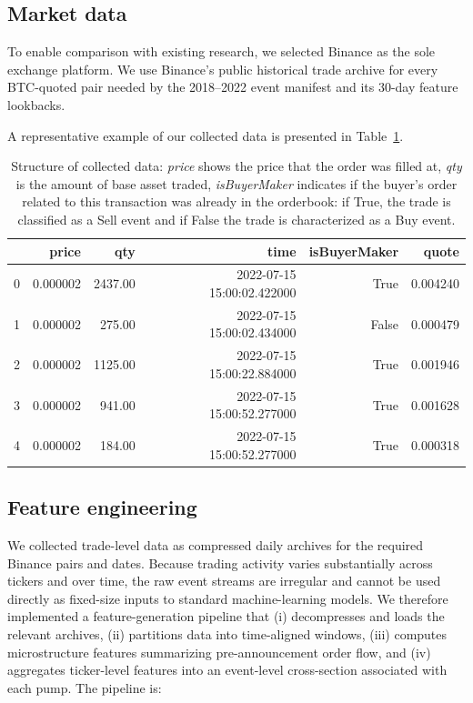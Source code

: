 \documentclass{ieeeaccess}
\begin{document}
\subsection{Market data}

To enable comparison with existing research, we selected Binance as the sole exchange platform. We use Binance's public historical trade archive for every BTC-quoted pair needed by the 2018--2022 event manifest and its 30-day feature lookbacks.

A representative example of our collected data is presented in Table~\ref{table:collected_tick_data}.

\begin{table}[!tbp]
    \centering
    \begin{tabular}{lrrrrr}
        \toprule
         & price & qty & time & isBuyerMaker & quote \\
        \midrule
        0 & 0.000002 & 2437.00 & 2022-07-15 15:00:02.422000 & True & 0.004240 \\
        1 & 0.000002 & 275.00& 2022-07-15 15:00:02.434000 & False & 0.000479 \\
        2 & 0.000002 & 1125.00 & 2022-07-15 15:00:22.884000 & True & 0.001946 \\
        3 & 0.000002 & 941.00 & 2022-07-15 15:00:52.277000 & True & 0.001628 \\
        4 & 0.000002 & 184.00 & 2022-07-15 15:00:52.277000 & True & 0.000318 \\
        \bottomrule
    \end{tabular}
    \caption{Structure of collected data: \textit{price} shows the price that the order was filled at, \textit{qty} is the amount of base asset traded, \textit{isBuyerMaker} indicates if the buyer's order related to this transaction was already in the orderbook: if True, the trade is classified as a Sell event and if False the trade is characterized as a Buy event.}
    \label{table:collected_tick_data}
\end{table}


\subsection{Feature engineering}

We collected trade-level data as compressed daily archives for the required Binance pairs and dates. Because trading activity varies substantially across tickers and over time, the raw event streams are irregular and cannot be used directly as fixed-size inputs to standard machine-learning models. We therefore implemented a feature-generation pipeline that (i) decompresses and loads the relevant archives, (ii) partitions data into time-aligned windows, (iii) computes microstructure features summarizing pre-announcement order flow, and (iv) aggregates ticker-level features into an event-level cross-section associated with each pump. The pipeline is:
\end{document}
